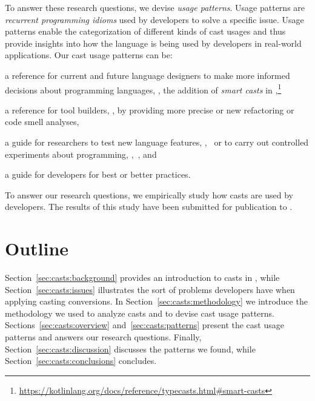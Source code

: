 To answer these research questions, we devise
\emph{usage patterns}.
Usage patterns are \emph{recurrent programming idioms} used by developers to solve a specific issue.
Usage patterns enable the categorization of different kinds of cast usages and
thus provide insights into how the language is being used by developers in real-world applications.
Our cast usage patterns can be:
\begin{inparaenum}[(1)]
\item a reference for current and future language designers
to make more informed decisions about programming languages,
\eg{},
the addition of \emph{smart casts} in ,\footnote{\url{https://kotlinlang.org/docs/reference/typecasts.html\#smart-casts}}
\item a reference for tool builders, \eg{}, by providing more precise or new
  refactoring or code smell analyses,
\item a guide for researchers to test new language features, \eg{},~\cite{wintherGuardedTypePromotion2011} or to carry out controlled
  experiments about programming, \eg{},~\cite{stuchlikStaticVsDynamic2011}, and
\item a guide for developers for best or better practices.
\end{inparaenum}
To answer our research questions,
we empirically study how casts are used by developers.
The results of this study have been submitted for publication to .


\section*{Outline}

Section~\ref{sec:casts:background} provides an introduction to casts in \java{},
while Section~\ref{sec:casts:issues} illustrates the sort of problems developers have when applying casting conversions.
In Section~\ref{sec:casts:methodology} we introduce the methodology we used to analyze casts and to devise cast usage patterns.
Sections~\ref{sec:casts:overview} and~\ref{sec:casts:patterns} present the cast usage patterns and answers our research questions.
Finally, Section~\ref{sec:casts:discussion} discusses the patterns we found,
while Section~\ref{sec:casts:conclusions} concludes.










